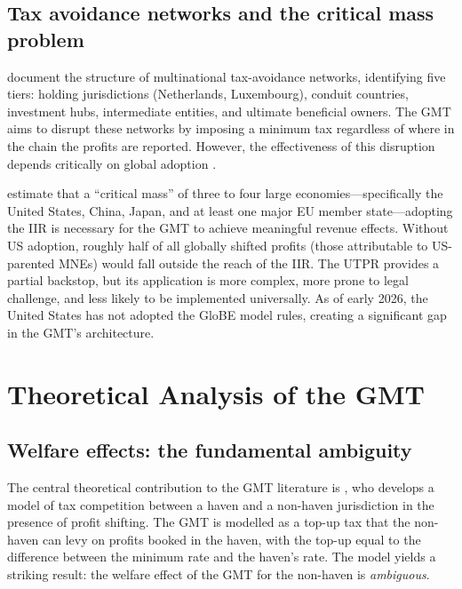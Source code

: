 \documentclass[12pt,a4paper]{article}
\begin{document}
\subsection{Tax avoidance networks and the critical mass problem}

\textcite{bilicka2023} document the structure of multinational tax-avoidance networks, identifying five tiers: holding jurisdictions (Netherlands, Luxembourg), conduit countries, investment hubs, intermediate entities, and ultimate beneficial owners.
The GMT aims to disrupt these networks by imposing a minimum tax regardless of where in the chain the profits are reported.
However, the effectiveness of this disruption depends critically on global adoption \parencite[see][on the interaction between rule order, incentives, and tax competition]{devereux2022}.

\textcite{devereux2023} estimate that a ``critical mass'' of three to four large economies---specifically the United States, China, Japan, and at least one major EU member state---adopting the IIR is necessary for the GMT to achieve meaningful revenue effects.
Without US adoption, roughly half of all globally shifted profits (those attributable to US-parented MNEs) would fall outside the reach of the IIR.
The UTPR provides a partial backstop, but its application is more complex, more prone to legal challenge, and less likely to be implemented universally.
As of early 2026, the United States has not adopted the GloBE model rules, creating a significant gap in the GMT's architecture.


\section{Theoretical Analysis of the GMT}\label{sec:theory}

\subsection{Welfare effects: the fundamental ambiguity}

The central theoretical contribution to the GMT literature is \textcite{Johannesen2022}, who develops a model of tax competition between a haven and a non-haven jurisdiction in the presence of profit shifting.
The GMT is modelled as a top-up tax that the non-haven can levy on profits booked in the haven, with the top-up equal to the difference between the minimum rate and the haven's rate.
The model yields a striking result: the welfare effect of the GMT for the non-haven is \emph{ambiguous}.
\end{document}
